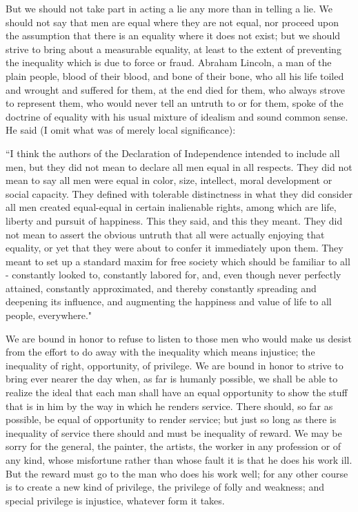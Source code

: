 \documentclass{scrbook}
\begin{document}
But we should not take part in acting a lie any more than in telling a lie. We should
not say that men are equal where they are not equal, nor proceed upon the assumption that
there is an equality where it does not exist; but we should strive to bring about a measurable
equality, at least to the extent of preventing the inequality which is due to force or fraud.
Abraham Lincoln, a man of the plain people, blood of their blood, and bone of their bone,
who all his life toiled and wrought and suffered for them, at the end died for them, who
always strove to represent them, who would never tell an untruth to or for them, spoke of
the doctrine of equality with his usual mixture of idealism and sound common sense. He
said (I omit what was of merely local significance):

``I think the authors of the Declaration of Independence intended to include all
men, but they did not mean to declare all men equal in all respects. They did not
mean to say all men were equal in color, size, intellect, moral development or
social capacity. They defined with tolerable distinctness in what they did consider all men created equal-equal in certain inalienable rights, among which
are life, liberty and pursuit of happiness. This they said, and this they meant.
They did not mean to assert the obvious untruth that all were actually enjoying
that equality, or yet that they were about to confer it immediately upon them.
They meant to set up a standard maxim for free society which should be familiar to all - constantly looked to, constantly labored for, and, even though never
perfectly attained, constantly approximated, and thereby constantly spreading
and deepening its influence, and augmenting the happiness and value of life to
all people, everywhere."

We are bound in honor to refuse to listen to those men who would make us desist from
the effort to do away with the inequality which means injustice; the inequality of right,
opportunity, of privilege. We are bound in honor to strive to bring ever nearer the day
when, as far is humanly possible, we shall be able to realize the ideal that each man shall
have an equal opportunity to show the stuff that is in him by the way in which he renders
service. There should, so far as possible, be equal of opportunity to render service; but just
so long as there is inequality of service there should and must be inequality of reward. We
may be sorry for the general, the painter, the artists, the worker in any profession or of any
kind, whose misfortune rather than whose fault it is that he does his work ill. But the reward
must go to the man who does his work well; for any other course is to create a new kind of
privilege, the privilege of folly and weakness; and special privilege is injustice, whatever
form it takes.
\end{document}
